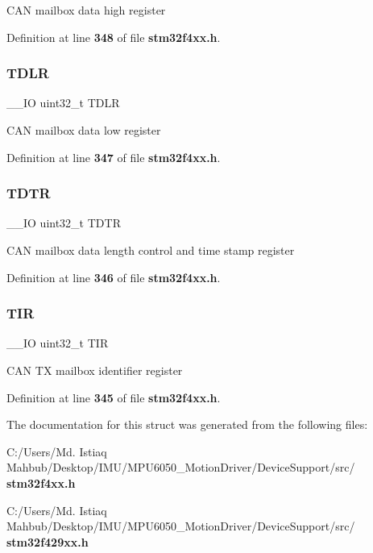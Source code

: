 C\+AN mailbox data high register 

Definition at line \textbf{ 348} of file \textbf{ stm32f4xx.\+h}.

\mbox{\label{structCAN__TxMailBox__TypeDef_aded1359e1a32512910bff534d57ade68}} 
\subsubsection{T\+D\+LR}
{\footnotesize\ttfamily \+\_\+\+\_\+\+IO uint32\+\_\+t T\+D\+LR}

C\+AN mailbox data low register 

Definition at line \textbf{ 347} of file \textbf{ stm32f4xx.\+h}.

\mbox{\label{structCAN__TxMailBox__TypeDef_aed87bed042dd9523ce086119a3bab0ea}} 
\subsubsection{T\+D\+TR}
{\footnotesize\ttfamily \+\_\+\+\_\+\+IO uint32\+\_\+t T\+D\+TR}

C\+AN mailbox data length control and time stamp register 

Definition at line \textbf{ 346} of file \textbf{ stm32f4xx.\+h}.

\mbox{\label{structCAN__TxMailBox__TypeDef_a6921aa1c578a7d17c6e0eb33a73b6630}} 
\subsubsection{T\+IR}
{\footnotesize\ttfamily \+\_\+\+\_\+\+IO uint32\+\_\+t T\+IR}

C\+AN TX mailbox identifier register 

Definition at line \textbf{ 345} of file \textbf{ stm32f4xx.\+h}.



The documentation for this struct was generated from the following files\+:\begin{DoxyCompactItemize}
\item 
C\+:/\+Users/\+Md. Istiaq Mahbub/\+Desktop/\+I\+M\+U/\+M\+P\+U6050\+\_\+\+Motion\+Driver/\+Device\+Support/src/\textbf{ stm32f4xx.\+h}\item 
C\+:/\+Users/\+Md. Istiaq Mahbub/\+Desktop/\+I\+M\+U/\+M\+P\+U6050\+\_\+\+Motion\+Driver/\+Device\+Support/src/\textbf{ stm32f429xx.\+h}\end{DoxyCompactItemize}
